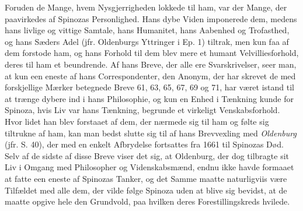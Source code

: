 \documentclass[12pt,a4paper]{book}
\newcommand{\opage}[1]{\marginnote{\footnotesize\textit{[#1]}}}
\begin{document}
Foruden de Mange, hvem Nysgjerrigheden lokkede til ham, var der Mange, der
paavirkedes af Spinozas Personlighed. Hans dybe Viden imponerede dem,
medens hans livlige og vittige Samtale, hans Humanitet, hans Aabenhed og
Trofasthed, og hans Sæders Adel (jfr. Oldenburgs Yttringer i Ep. 1)
tiltrak, men kun faa af dem forstode ham, og hans Forhold til dem blev
mere et humant Velvilliesforhold, deres til ham et beundrende. Af hans
Breve, der alle ere Svarskrivelser, seer man, at kun een eneste af hans
Correspondenter, den Anonym, der har skrevet de med forskjellige Mærker
betegnede Breve 61, 63, 65, 67, 69 og 71, har været istand til at trænge
dybere ind i hans Philosophie, og kun en Enhed i Tænkning kunde for
Spinoza, hvis Liv var hans Tænkning, begrunde et virkeligt
Venskabsforhold. Hvor lidet han blev forstaaet af dem, der nærmede sig til
ham og følte sig tiltrukne af ham, kan man bedst slutte sig til af hans
Brevvexling med \emph{Oldenburg} (jfr. S. 40), der med en enkelt
Afbrydelse fortsattes fra 1661 til Spinozas Død. Selv af de
\opage{32} \setcounter{footnote}{0}%
sidste af disse Breve viser det sig, at Oldenburg, der dog tilbragte sit
Liv i Omgang med Philosopher og Videnskabsmænd, endnu ikke havde formaaet
at fatte een eneste af Spinozas Tanker, og det Samme maatte naturligviis
være Tilfældet med alle dem, der vilde følge Spinoza uden at blive sig
bevidst, at de maatte opgive hele den Grundvold, paa hvilken deres
Forestillingskreds hvilede.
\end{document}
